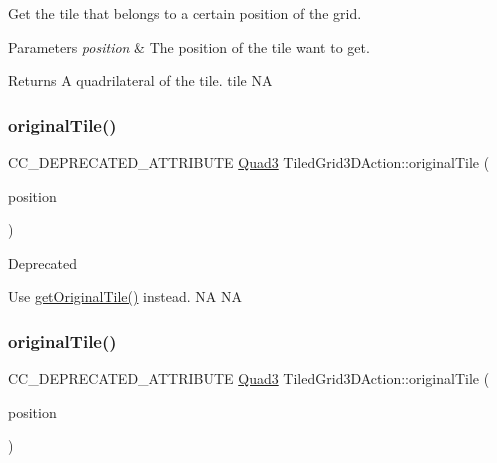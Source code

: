 Get the tile that belongs to a certain position of the grid. 


\begin{DoxyParams}{Parameters}
{\em position} & The position of the tile want to get. \\
\hline
\end{DoxyParams}
\begin{DoxyReturn}{Returns}
A quadrilateral of the tile.  tile  NA 
\end{DoxyReturn}
\mbox{\label{classTiledGrid3DAction_a6f627438c608ce230cbf60d7efddcfd6}} 
\subsubsection{\texorpdfstring{original\+Tile()}{originalTile()}\hspace{0.1cm}{\footnotesize\ttfamily [1/2]}}
{\footnotesize\ttfamily C\+C\+\_\+\+D\+E\+P\+R\+E\+C\+A\+T\+E\+D\+\_\+\+A\+T\+T\+R\+I\+B\+U\+TE \hyperlink{structQuad3}{Quad3} Tiled\+Grid3\+D\+Action\+::original\+Tile (\begin{DoxyParamCaption}\item[{const \hyperlink{classVec2}{Vec2} \&}]{position }\end{DoxyParamCaption})\hspace{0.3cm}{\ttfamily [inline]}}

\begin{DoxyRefDesc}{Deprecated}
\item[\hyperlink{deprecated__deprecated000010}{Deprecated}]Use \hyperlink{classTiledGrid3DAction_a4529b2fa5b1aafecad8537985c2d7d1b}{get\+Original\+Tile()} instead.  NA  NA \end{DoxyRefDesc}
\mbox{\label{classTiledGrid3DAction_a6f627438c608ce230cbf60d7efddcfd6}} 
\subsubsection{\texorpdfstring{original\+Tile()}{originalTile()}\hspace{0.1cm}{\footnotesize\ttfamily [2/2]}}
{\footnotesize\ttfamily C\+C\+\_\+\+D\+E\+P\+R\+E\+C\+A\+T\+E\+D\+\_\+\+A\+T\+T\+R\+I\+B\+U\+TE \hyperlink{structQuad3}{Quad3} Tiled\+Grid3\+D\+Action\+::original\+Tile (\begin{DoxyParamCaption}\item[{const \hyperlink{classVec2}{Vec2} \&}]{position }\end{DoxyParamCaption})\hspace{0.3cm}{\ttfamily [inline]}}


